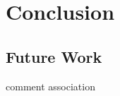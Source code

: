 
\chapter{Conclusion}\label{cha:Conclusion}

\section{Future Work}\label{sec:FutureWork}
comment association
